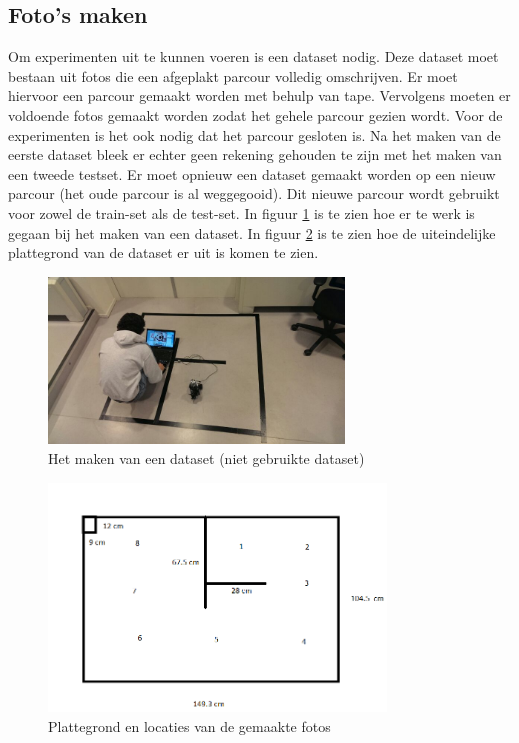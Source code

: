 \documentclass[a4paper]{article}
\begin{document}
\subsection{Foto's maken}
Om experimenten uit te kunnen voeren is een dataset nodig. Deze dataset moet bestaan uit fotos die een afgeplakt parcour volledig omschrijven. Er moet hiervoor een parcour gemaakt worden met behulp van tape. Vervolgens moeten er voldoende fotos gemaakt worden zodat het gehele parcour gezien wordt. Voor de experimenten is het ook nodig dat het parcour gesloten is. Na het maken van de eerste dataset bleek er echter geen rekening gehouden te zijn met het maken van een tweede testset. Er moet opnieuw een dataset gemaakt worden op een nieuw parcour (het oude parcour is al weggegooid). Dit nieuwe parcour wordt gebruikt voor zowel de train-set als de test-set. In figuur \ref{fig:datasetmaken} is te zien hoe er te werk is gegaan bij het maken van een dataset. In figuur \ref{fig:plattegrond} is te zien hoe de uiteindelijke plattegrond van de dataset er uit is komen te zien.
\begin{figure}[h]
	\centering
	\includegraphics[width=0.7\textwidth]{dataset1.jpg}
	\caption{Het maken van een dataset (niet gebruikte dataset)}
	\label{fig:datasetmaken}
\end{figure}
\begin{figure}[h]
	\centering
	\includegraphics[width=0.8\textwidth]{opzet.png}
	\caption{Plattegrond en locaties van de gemaakte fotos}
	\label{fig:plattegrond}
\end{figure}
\end{document}
